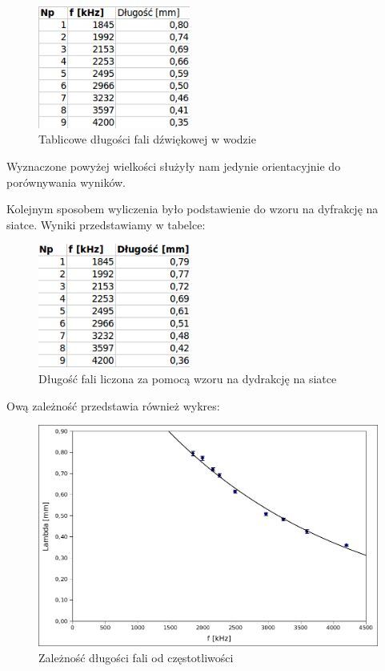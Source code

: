 \documentclass[a4paper,12pt]{article}
\begin{document}
\begin{figure} [H]
  \begin{center}
    \includegraphics[width = 5cm]{tab3.png}
    \caption{Tablicowe długości fali dźwiękowej w wodzie}
  \end{center}
\end{figure}

Wyznaczone powyżej wielkości służyły nam jedynie orientacyjnie do porównywania wyników. 

Kolejnym sposobem wyliczenia było podstawienie do wzoru na dyfrakcję na siatce. Wyniki przedstawiamy w tabelce: 

\begin{figure} [H]
  \begin{center}
    \includegraphics[width = 5cm]{tab4.png}
    \caption{Długość fali liczona za pomocą wzoru na dydrakcję na siatce}
  \end{center}
\end{figure}

Ową zależność przedstawia również wykres: 

\begin{figure} [H]
  \begin{center}
    \includegraphics[width = 12cm]{wykres1.png}
    \caption{Zależność długości fali od częstotliwości}
  \end{center}
\end{figure}
\end{document}
